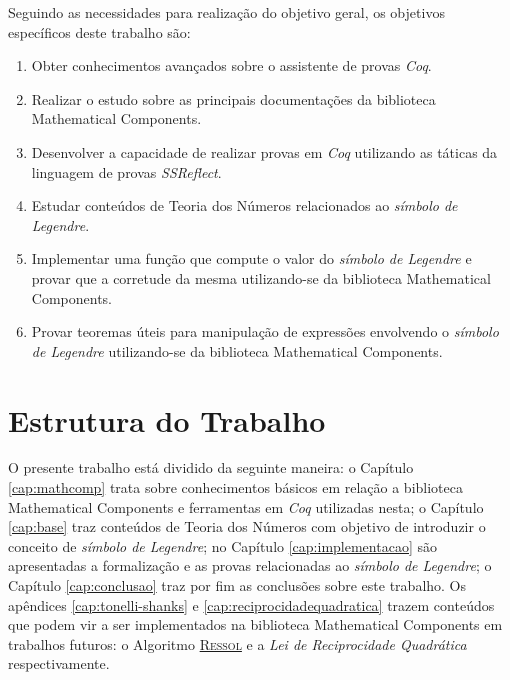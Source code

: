 Seguindo as necessidades para realização do objetivo geral, os objetivos específicos deste trabalho são:

\begin{enumerate}
    \item Obter conhecimentos avançados sobre o assistente de provas \textit{Coq}.
    \item Realizar o estudo sobre as principais documentações da biblioteca Mathematical Components.
    \item Desenvolver a capacidade de realizar provas em \textit{Coq} utilizando as táticas da linguagem de provas \textit{SSReflect}.
    \item Estudar conteúdos de Teoria dos Números relacionados ao \textit{símbolo de Legendre}.
    \item \label{obj:func} Implementar uma função que compute o valor do \textit{símbolo de Legendre} e provar que a corretude da mesma utilizando-se da biblioteca Mathematical Components.
    \item \label{obj:proofs} Provar teoremas úteis para manipulação de expressões envolvendo o \textit {símbolo de Legendre} utilizando-se da biblioteca Mathematical Components.
\end{enumerate}
 
\section{Estrutura do Trabalho}

O presente trabalho está dividido da seguinte maneira: o Capítulo \ref{cap:mathcomp} trata sobre conhecimentos básicos em relação a biblioteca Mathematical Components e ferramentas em \textit{Coq} utilizadas nesta; o Capítulo \ref{cap:base} traz conteúdos de Teoria dos Números com objetivo de introduzir o conceito de \textit{símbolo de Legendre}; no Capítulo \ref{cap:implementacao} são apresentadas a formalização e as provas relacionadas ao \textit{símbolo de Legendre}; o Capítulo \ref{cap:conclusao} traz por fim as conclusões sobre este trabalho. Os apêndices \ref{cap:tonelli-shanks} e \ref{cap:reciprocidadequadratica} trazem conteúdos que podem vir a ser implementados na biblioteca Mathematical Components em trabalhos futuros: o Algoritmo \hyperref[algo:ressol]{\textsc{Ressol}} e a \textit{Lei de Reciprocidade Quadrática} respectivamente.

